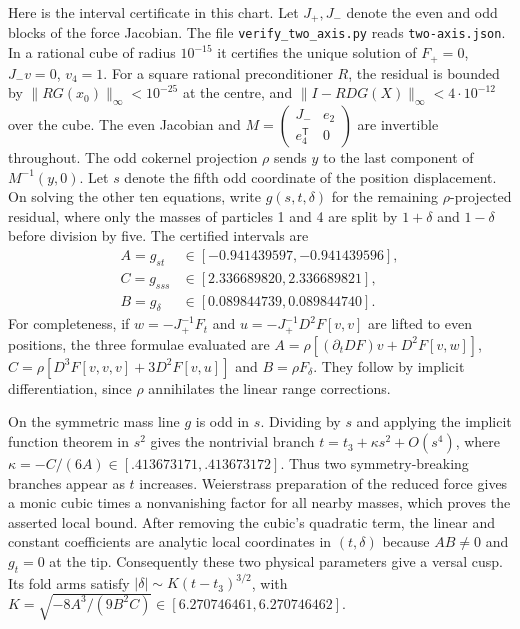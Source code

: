 \documentclass[11pt]{article}
\begin{document}
Here is the interval certificate in this chart.
Let $J_+,J_-$ denote the even and odd blocks of the force Jacobian.
The file \texttt{verify\_two\_axis.py} reads \texttt{two-axis.json}.
In a rational cube of radius $10^{-15}$ it certifies the unique solution
of $F_+=0$, $J_-v=0$, $v_4=1$. For a square rational preconditioner $R$,
the residual is bounded by $\|RG(x_0)\|_\infty<10^{-25}$ at the centre,
and $\|I-RDG(X)\|_\infty<4\cdot10^{-12}$ over the cube.
The even Jacobian and
$M=\left(\begin{smallmatrix}J_-&e_2\\ e_4^{\mathsf T}&0\end{smallmatrix}\right)$
are invertible throughout. The odd cokernel projection $\rho$ sends $y$ to
the last component of $M^{-1}(y,0)$.
Let $s$ denote the fifth odd coordinate of the position
displacement. On solving the other ten equations, write $g(s,t,\delta)$
for the remaining $\rho$-projected residual, where only the masses of
particles 1 and 4 are split by $1+\delta$ and $1-\delta$ before division
by five. The certified intervals are
\begin{align*}
 A=g_{st}&\in[-0.941439597,-0.941439596],\\
 C=g_{sss}&\in[2.336689820,2.336689821],\\
 B=g_\delta&\in[0.089844739,0.089844740].
\end{align*}
For completeness, if $w=-J_+^{-1}F_t$ and $u=-J_+^{-1}D^2F[v,v]$
are lifted to even positions, the three formulae evaluated are
$A=\rho[(\partial_t DF)v+D^2F[v,w]]$,
$C=\rho[D^3F[v,v,v]+3D^2F[v,u]]$ and $B=\rho F_\delta$.
They follow by implicit differentiation, since $\rho$ annihilates the
linear range corrections.

On the symmetric mass line $g$ is odd in $s$. Dividing by $s$ and applying
the implicit function theorem in $s^2$ gives the nontrivial branch
$t=t_3+\kappa s^2+O(s^4)$, where
$\kappa=-C/(6A)\in[.413673171,.413673172]$. Thus two symmetry-breaking
branches appear as $t$ increases. Weierstrass preparation of the reduced
force gives a monic cubic times a nonvanishing factor for all nearby
masses, which proves the asserted local bound. After removing the cubic's
quadratic term, the linear and constant coefficients are analytic local
coordinates in $(t,\delta)$ because $AB\ne0$ and $g_t=0$ at the tip.
Consequently these two physical parameters give a versal cusp.
Its fold arms satisfy
$|\delta|\sim K(t-t_3)^{3/2}$, with
$K=\sqrt{-8A^3/(9B^2C)}\in[6.270746461,6.270746462]$.
\end{document}
